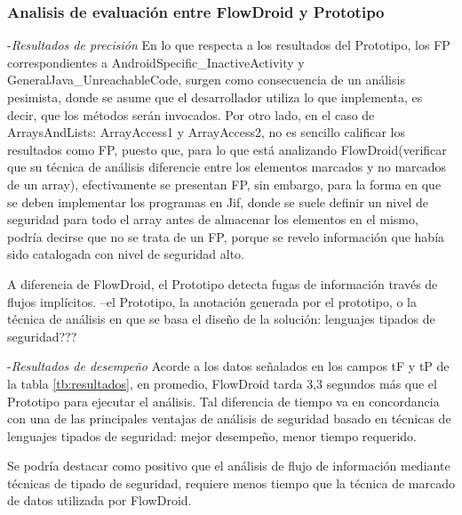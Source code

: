 \subsubsection{Analisis de evaluación entre FlowDroid y Prototipo}
-\textit{Resultados de precisión}\newline
En lo que respecta a los resultados del Prototipo, los FP correspondientes a
AndroidSpecific\_InactiveActivity y GeneralJava\_UnreachableCode, surgen como
consecuencia de un análisis pesimista, donde se asume que el desarrollador
utiliza lo que implementa, es decir, que los métodos serán invocados.\newline 
Por otro lado, en el caso de ArraysAndLists: ArrayAccess1 y ArrayAccess2, no es
sencillo calificar los resultados como FP, puesto que, para lo que está
analizando FlowDroid(verificar que su técnica de análisis diferencie entre los
elementos marcados y no marcados de un array), efectivamente se presentan FP,
sin embargo, para la forma en que se deben implementar los programas en Jif,
donde se suele definir un nivel de seguridad para todo el array antes de
almacenar los elementos en el mismo, podría decirse que no se trata de un FP,
porque se revelo información que había sido catalogada con nivel de seguridad alto.

A diferencia de FlowDroid, el Prototipo detecta fugas de
información través de flujos implícitos.\newline
--el Prototipo, la anotación generada por el prototipo, o la técnica de análisis
en que se basa el diseño de la solución: lenguajes tipados de seguridad???

-\textit{Resultados de desempeño}\newline
Acorde a los datos señalados en los campos tF y tP de la tabla
\ref{tb:resultados}, en promedio, FlowDroid tarda 3,3 segundos más que el
Prototipo para ejecutar el análisis.\newline
Tal diferencia de tiempo va en concordancia con una de las principales ventajas
de análisis de seguridad basado en técnicas de lenguajes tipados de seguridad:
mejor desempeño, menor tiempo requerido.\newline

Se podría destacar como positivo que el análisis de flujo de información
mediante técnicas de tipado de seguridad, requiere menos tiempo que la técnica
de marcado de datos utilizada por FlowDroid.

